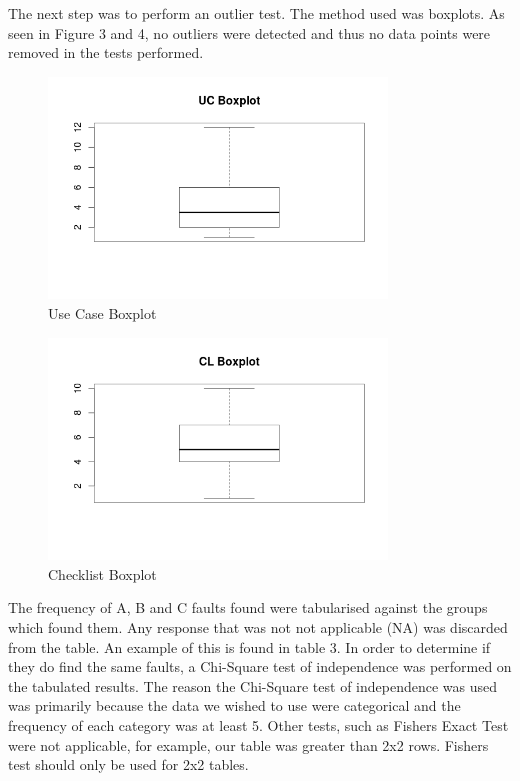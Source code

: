 \documentclass[10pt,twocolumn]{article}
\begin{document}
The next step was to perform an outlier test. The method used was boxplots. As seen in Figure 3 and 4, no outliers were detected and thus no data points were removed in the tests performed. 

\begin{figure}[ht]
\centering
\includegraphics[width=90mm]{uc_box.png}
\caption{Use Case Boxplot}
\end{figure}

\begin{figure}[ht]
\centering
\includegraphics[width=90mm]{cl_box.png}
\caption{Checklist Boxplot}
\end{figure}


The frequency of A, B and C faults found were tabularised against the groups which found them. Any response that was not not applicable (NA) was discarded from the table. An example of this is found in table 3. In order to determine if they do find the same faults, a Chi-Square test of independence was performed on the tabulated results. The reason the Chi-Square test of independence was used was primarily because the data we wished to use were categorical and the frequency of each category was at least 5. Other tests, such as Fishers Exact Test were not applicable, for example, our table was greater than 2x2 rows. Fishers test should only be used for 2x2 tables.
\end{document}
